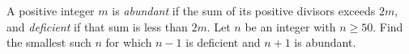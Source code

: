 A positive integer $m$ is \emph{abundant} if the sum of its positive divisors exceeds $2m$, and \emph{deficient} if that sum is less than $2m$. Let $n$ be an integer with $n\ge50$. Find the smallest such $n$ for which $n-1$ is deficient and $n+1$ is abundant.
